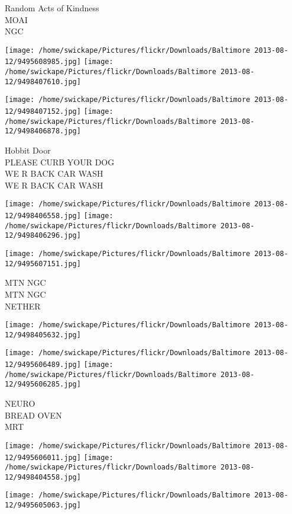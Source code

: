 \documentclass[10pt,letterpaper]{article}
\begin{document}
Random Acts of Kindness\\
MOAI\\
NGC\\
\pagebreak

\texttt{[image: /home/swickape/Pictures/flickr/Downloads/Baltimore 2013-08-12/9495608985.jpg]}
\texttt{[image: /home/swickape/Pictures/flickr/Downloads/Baltimore 2013-08-12/9498407610.jpg]}

\texttt{[image: /home/swickape/Pictures/flickr/Downloads/Baltimore 2013-08-12/9498407152.jpg]}
\texttt{[image: /home/swickape/Pictures/flickr/Downloads/Baltimore 2013-08-12/9498406878.jpg]}

Hobbit Door\\
PLEASE CURB YOUR DOG\\
WE R BACK CAR WASH\\
WE R BACK CAR WASH\\
\pagebreak

\texttt{[image: /home/swickape/Pictures/flickr/Downloads/Baltimore 2013-08-12/9498406558.jpg]}
\texttt{[image: /home/swickape/Pictures/flickr/Downloads/Baltimore 2013-08-12/9498406296.jpg]}

\texttt{[image: /home/swickape/Pictures/flickr/Downloads/Baltimore 2013-08-12/9495607151.jpg]}

MTN NGC\\
MTN NGC\\
NETHER\\
\pagebreak

\texttt{[image: /home/swickape/Pictures/flickr/Downloads/Baltimore 2013-08-12/9498405632.jpg]}

\vspace{0.25in}
\texttt{[image: /home/swickape/Pictures/flickr/Downloads/Baltimore 2013-08-12/9495606489.jpg]}
\texttt{[image: /home/swickape/Pictures/flickr/Downloads/Baltimore 2013-08-12/9495606285.jpg]}

NEURO\\
BREAD OVEN\\
MRT\\
\pagebreak

\texttt{[image: /home/swickape/Pictures/flickr/Downloads/Baltimore 2013-08-12/9495606011.jpg]}
\texttt{[image: /home/swickape/Pictures/flickr/Downloads/Baltimore 2013-08-12/9498404558.jpg]}

\vspace{0.25in}
\texttt{[image: /home/swickape/Pictures/flickr/Downloads/Baltimore 2013-08-12/9495605063.jpg]}
\end{document}
